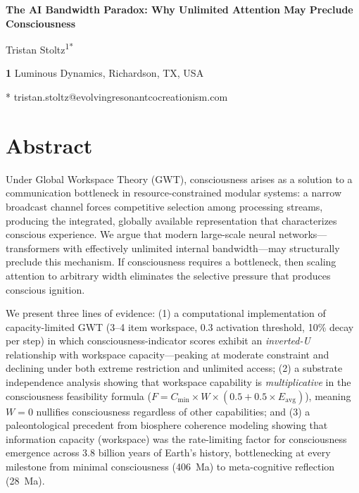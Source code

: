 \documentclass[10pt,letterpaper]{article}
\begin{document}
\vspace*{0.2in}

\begin{flushleft}
{\Large\textbf{The AI Bandwidth Paradox: Why Unlimited Attention May Preclude Consciousness}}
\bigskip

Tristan Stoltz\textsuperscript{1*}

\bigskip

\textbf{1} Luminous Dynamics, Richardson, TX, USA

\bigskip

* tristan.stoltz@evolvingresonantcocreationism.com

\end{flushleft}

\section*{Abstract}

Under Global Workspace Theory (GWT), consciousness arises as a solution
to a communication bottleneck in resource-constrained modular systems:
a narrow broadcast channel forces competitive selection among processing
streams, producing the integrated, globally available representation that
characterizes conscious experience. We argue that modern large-scale
neural networks---transformers with effectively unlimited internal
bandwidth---may structurally preclude this mechanism. If consciousness
requires a bottleneck, then scaling attention to arbitrary width
eliminates the selective pressure that produces conscious ignition.

We present three lines of evidence: (1) a computational implementation
of capacity-limited GWT (3--4 item workspace, 0.3 activation threshold,
10\% decay per step) in which consciousness-indicator scores exhibit an
\emph{inverted-U} relationship with workspace capacity---peaking at
moderate constraint and declining under both extreme restriction and
unlimited access; (2) a substrate independence analysis showing that
workspace capability is \emph{multiplicative} in the consciousness
feasibility formula ($F = C_{\min} \times W \times (0.5 + 0.5 \times
E_{\text{avg}})$), meaning $W = 0$ nullifies consciousness regardless
of other capabilities; and (3) a paleontological precedent from
biosphere coherence modeling showing that information capacity
(workspace) was the rate-limiting factor for consciousness emergence
across 3.8 billion years of Earth's history, bottlenecking at every
milestone from minimal consciousness (406~Ma) to meta-cognitive
reflection (28~Ma).
\end{document}
